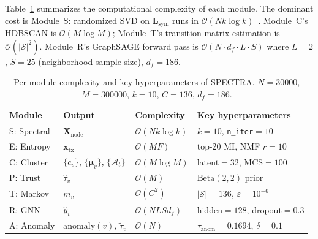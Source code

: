 \documentclass[journal]{IEEEtran}
\begin{document}
Table~\ref{tab:module_summary} summarizes the computational complexity of each
module.
The dominant cost is Module~S: randomized SVD on $\mathbf{L}_{\mathrm{sym}}$
runs in $\mathcal{O}(N k \log k)$~\cite{Halko2011}.
Module~C's HDBSCAN is $\mathcal{O}(M \log M)$; Module~T's transition matrix
estimation is $\mathcal{O}(|\mathcal{S}|^2)$.
Module~R's GraphSAGE forward pass is $\mathcal{O}(N \cdot d_f \cdot L \cdot S)$
where $L = 2$, $S = 25$ (neighborhood sample size), $d_f = 186$.

\begin{table}[t]
  \caption{Per-module complexity and key hyperparameters of \textsc{SPECTRA}.
           $N=\num{30000}$, $M=\num{300000}$, $k=10$, $C=136$, $d_f=186$.}
  \label{tab:module_summary}
  \centering
  \renewcommand{\arraystretch}{1.15}
  \begin{tabular}{@{}lllp{3.2cm}@{}}
    \toprule
    \textbf{Module} & \textbf{Output} & \textbf{Complexity} & \textbf{Key hyperparameters} \\
    \midrule
    S: Spectral  & $\mathbf{X}_{\mathrm{node}}$
                  & $\mathcal{O}(Nk\log k)$
                  & $k{=}10$, \texttt{n\_iter}$=10$ \\
    E: Entropy   & $\mathbf{x}_{\mathrm{tx}}$
                  & $\mathcal{O}(MF)$
                  & top-20 MI, NMF $r{=}10$ \\
    C: Cluster   & $\{c_v\}$, $\{\boldsymbol{\mu}_v\}$, $\{\mathcal{A}_t\}$
                  & $\mathcal{O}(M\log M)$
                  & latent$=32$, MCS$=100$ \\
    P: Trust     & $\hat{\tau}_v$
                  & $\mathcal{O}(M)$
                  & $\mathrm{Beta}(2,2)$ prior \\
    T: Markov    & $m_v$
                  & $\mathcal{O}(C^2)$
                  & $|\mathcal{S}|{=}136$, $\varepsilon{=}10^{-6}$ \\
    R: GNN       & $\hat{y}_v$
                  & $\mathcal{O}(NLSd_f)$
                  & hidden$=128$, dropout$=0.3$ \\
    A: Anomaly   & $\mathrm{anomaly}(v)$, $\tilde{\tau}_v$
                  & $\mathcal{O}(N)$
                  & $\tau_{\mathrm{anom}}{=}0.1694$, $\delta{=}0.1$ \\
    \bottomrule
  \end{tabular}
\end{table}
\end{document}
